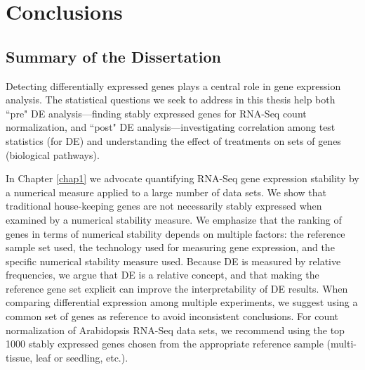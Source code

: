 \pagebreak
\newpage

\section{Conclusions}\label{ch:conclusion}

\subsection{Summary of the Dissertation}
Detecting differentially expressed genes plays a central role in gene expression analysis. The 
statistical questions we seek to address in this thesis help both ``pre" DE analysis---finding 
stably expressed genes for RNA-Seq count normalization, and ``post" DE analysis---investigating 
correlation among test statistics (for DE) and understanding the effect of treatments on sets of 
genes (biological pathways).

In Chapter \ref{chap1} we advocate quantifying RNA-Seq gene expression stability by a numerical 
measure applied to a large number of data sets. We show that traditional house-keeping genes are 
not necessarily stably expressed when examined by a numerical stability measure. 
We emphasize that the ranking of genes in terms of numerical stability depends on multiple factors: 
the reference sample set used, the technology used for measuring gene expression, and the specific 
numerical stability measure used. Because DE is measured by relative frequencies, we argue that DE 
is a relative concept, and that making the reference gene set explicit can improve the 
interpretability of DE results.  When comparing differential expression among multiple experiments, 
we suggest using a common set of genes as reference to avoid inconsistent conclusions. For count 
normalization of Arabidopsis RNA-Seq data sets,  we recommend  using the top 1000 stably expressed 
genes chosen from the appropriate reference sample (multi-tissue, leaf or seedling, etc.).

